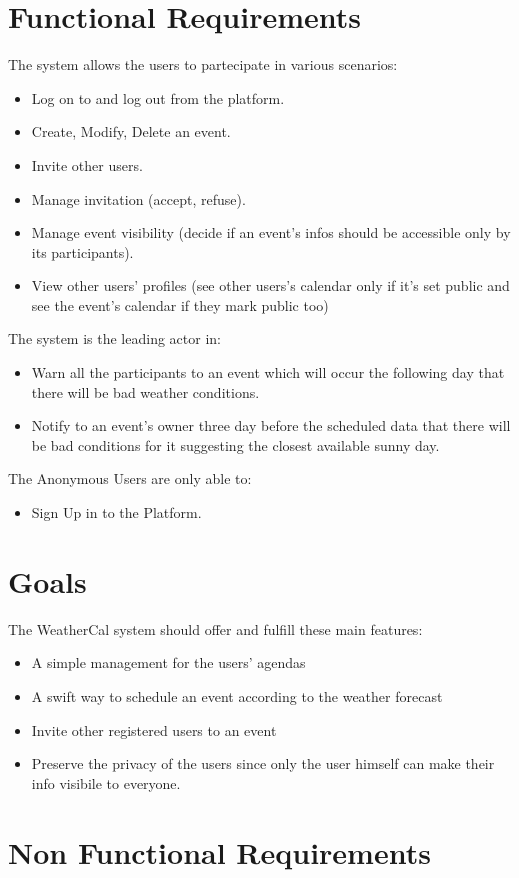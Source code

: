 \section{Functional Requirements}
The system allows the users to partecipate in various scenarios:
\begin{itemize}
\item Log on to and log out from the platform.
\item Create, Modify, Delete an event.
\item Invite other users.
\item Manage invitation (accept, refuse).
\item Manage event visibility (decide if an event's infos should be accessible only by its participants). 
\item View other users' profiles (see other users's calendar only if it's set public and see the event's calendar if they mark public too)
\end{itemize}
The system is the leading actor in:
\begin{itemize}
\item {Warn all the participants to an event which will occur the following day that there will be bad weather conditions.} 
\item Notify to an event's owner three day before the scheduled data that there will be bad conditions for it suggesting the closest available sunny day.
\end{itemize}
The Anonymous Users are only able to:
\begin{itemize}
\item Sign Up in to the Platform.
\end{itemize}
\section {Goals}
The WeatherCal system should offer and fulfill these main features:
\begin{itemize}
\item A simple management for the users' agendas
\item A swift way to schedule an event according to the weather forecast 
\item Invite other registered users to an event
\item Preserve the privacy of the users since only the user himself can make their info visibile to everyone.
\end{itemize}
\section{Non Functional Requirements}
